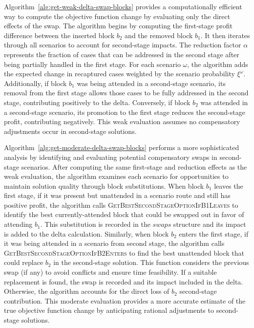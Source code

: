 Algorithm~\ref{alg:get-weak-delta-swap-blocks} provides a computationally efficient way to compute the objective function change by evaluating only the direct effects of the swap. The algorithm begins by computing the first-stage profit difference between the inserted block $b_2$ and the removed block $b_1$.
It then iterates through all scenarios to account for second-stage impacts. The reduction factor $\alpha$ represents the fraction of cases that can be addressed in the second stage after being partially handled in the first stage. For each scenario $\omega$, the algorithm adds the expected change in recaptured cases weighted by the scenario probability $\xi^{\omega}$. Additionally, if block $b_1$ was being attended in a second-stage scenario, its removal from the first stage allows those cases to be fully addressed in the second stage, contributing positively to the delta. Conversely, if block $b_2$ was attended in a second-stage scenario, its promotion to the first stage reduces the second-stage profit, contributing negatively. This weak evaluation assumes no compensatory adjustments occur in second-stage solutions.

Algorithm~\ref{alg:get-moderate-delta-swap-blocks} performs a more sophisticated analysis by identifying and evaluating potential compensatory swaps in second-stage scenarios. After computing the same first-stage and reduction effects as the weak evaluation, the algorithm examines each scenario for opportunities to maintain solution quality through block substitutions. When block $b_1$ leaves the first stage, if it was present but unattended in a scenario route and still has positive profit, the algorithm calls \textsc{GetBestSecondStageOptionIfB1Leaves} to identify the best currently-attended block that could be swapped out in favor of attending $b_1$. This substitution is recorded in the $swaps$ structure and its impact is added to the delta calculation. Similarly, when block $b_2$ enters the first stage, if it was being attended in a scenario from second stage, the algorithm calls \textsc{GetBestSecondStageOptionIfB2Enters} to find the best unattended block that could replace $b_2$ in the second-stage solution. This function considers the previous swap (if any) to avoid conflicts and ensure time feasibility. If a suitable replacement is found, the swap is recorded and its impact included in the delta. Otherwise, the algorithm accounts for the direct loss of $b_2$ second-stage contribution. This moderate evaluation provides a more accurate estimate of the true objective function change by anticipating rational adjustments to second-stage solutions.

